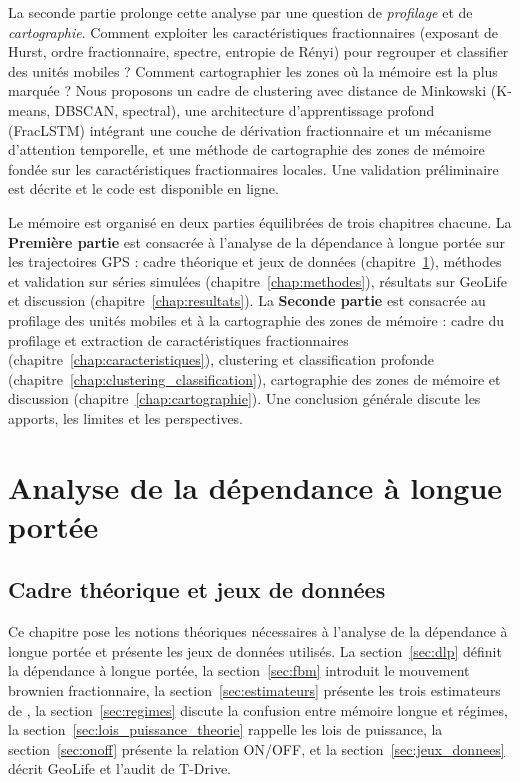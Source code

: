 La seconde partie prolonge cette analyse par une question de \emph{profilage} et de \emph{cartographie}. Comment exploiter les caractéristiques fractionnaires (exposant de Hurst, ordre fractionnaire, spectre, entropie de Rényi) pour regrouper et classifier des unités mobiles ? Comment cartographier les zones où la mémoire est la plus marquée ? Nous proposons un cadre de clustering avec distance de Minkowski (K-means, DBSCAN, spectral), une architecture d'apprentissage profond (FracLSTM) intégrant une couche de dérivation fractionnaire et un mécanisme d'attention temporelle, et une méthode de cartographie des zones de mémoire fondée sur les caractéristiques fractionnaires locales. Une validation préliminaire est décrite et le code est disponible en ligne.

Le mémoire est organisé en deux parties équilibrées de trois chapitres chacune. La \textbf{Première partie} est consacrée à l'analyse de la dépendance à longue portée sur les trajectoires GPS : cadre théorique et jeux de données (chapitre~\ref{chap:cadre_donnees}), méthodes et validation sur séries simulées (chapitre~\ref{chap:methodes}), résultats sur GeoLife et discussion (chapitre~\ref{chap:resultats}). La \textbf{Seconde partie} est consacrée au profilage des unités mobiles et à la cartographie des zones de mémoire : cadre du profilage et extraction de caractéristiques fractionnaires (chapitre~\ref{chap:caracteristiques}), clustering et classification profonde (chapitre~\ref{chap:clustering_classification}), cartographie des zones de mémoire et discussion (chapitre~\ref{chap:cartographie}). Une conclusion générale discute les apports, les limites et les perspectives.

\part{Analyse de la dépendance à longue portée}

\chapter{Cadre théorique et jeux de données}
\label{chap:cadre_donnees}

Ce chapitre pose les notions théoriques nécessaires à l'analyse de la dépendance à longue portée et présente les jeux de données utilisés. La section~\ref{sec:dlp} définit la dépendance à longue portée, la section~\ref{sec:fbm} introduit le mouvement brownien fractionnaire, la section~\ref{sec:estimateurs} présente les trois estimateurs de \Hurst, la section~\ref{sec:regimes} discute la confusion entre mémoire longue et régimes, la section~\ref{sec:lois_puissance_theorie} rappelle les lois de puissance, la section~\ref{sec:onoff} présente la relation ON/OFF, et la section~\ref{sec:jeux_donnees} décrit GeoLife et l'audit de T-Drive.

